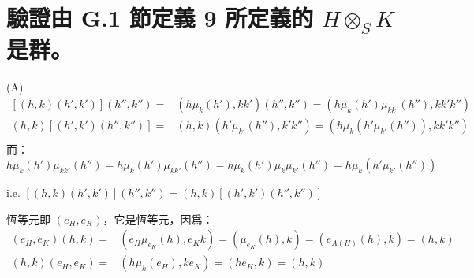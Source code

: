 \documentclass{article}
\begin{document}
\section{驗證由 G.1 節定義 9 所定義的 $H\otimes_SK$ 是群。}
\begin{framed}
  (A)
  $$\begin{aligned}
      \left[ {\left( {h,k} \right)\left( {h',k'} \right)} \right]\left( {h'',k''} \right) = & \left( {h{\mu _k}\left( {h'} \right),kk'} \right)\left( {h'',k''} \right) = \left( {h{\mu _k}\left( {h'} \right){\mu _{kk'}}\left( {h''} \right),kk'k''} \right)   \\
      \left( {h,k} \right)\left[ {\left( {h',k'} \right)\left( {h'',k''} \right)} \right] = & \left( {h,k} \right)\left( {h'{\mu _{k'}}\left( {h''} \right),k'k''} \right) = \left( {h{\mu _k}\left( {h'{\mu _{k'}}\left( {h''} \right)} \right),kk'k''} \right) \\
    \end{aligned} $$
  而：
  $$h{\mu _k}\left( {h'} \right){\mu _{kk'}}\left( {h''} \right) = h{\mu _k}\left( {h'} \right)\mu _{ {kk'}}\left( {h''} \right) = h{\mu _k}\left( {h'} \right)\mu _{k}{\mu _{k'}}\left( {h''} \right) = h{\mu _k}\left( {h'{\mu _{k'}}\left( {h''} \right)} \right)$$

  i.e.  $\left[ {\left( {h,k} \right)\left( {h',k'} \right)} \right]\left( {h'',k''} \right)=\left( {h,k} \right)\left[ {\left( {h',k'} \right)\left( {h'',k''} \right)} \right]$

  恆等元即  $\left( {{e_H},{e_K}} \right)$，它是恆等元，因爲：
  $$\begin{aligned}
      \left( {{e_H},{e_K}} \right)\left( {h,k} \right) = & \left( {{e_H}{\mu _{{e_K}}}\left( h \right),{e_K}k} \right) = \left( {{\mu _{{e_K}}}\left( h \right),k} \right) = \left( {{e_{A\left( H \right)}}\left( h \right),k} \right) = \left( {h,k} \right) \\
      \left( {h,k} \right)\left( {{e_H},{e_K}} \right) = & \left( {h{\mu _k}\left( {{e_H}} \right),k{e_K}} \right) = \left( {h{e_H},k} \right) = \left( {h,k} \right)                                                                                          \\
    \end{aligned} $$


\end{framed}
\end{document}
